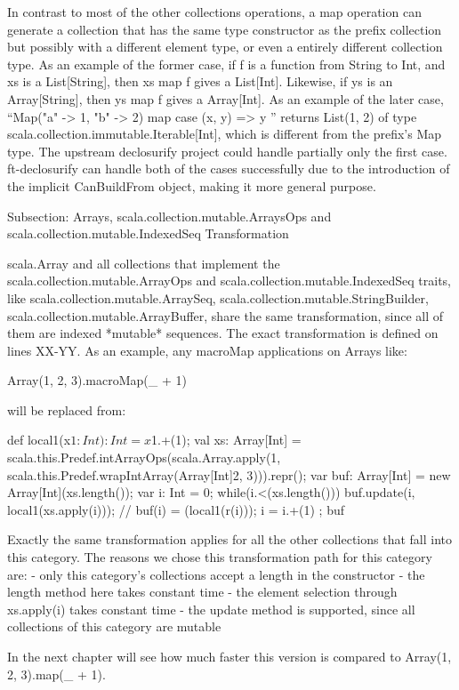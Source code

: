 In contrast to most of the other collections operations, a map operation can
generate a collection that has the same type constructor as the prefix
collection but possibly with a different element type, or even a entirely
different collection type. As an example of the former case, if f is a function
from String to Int, and xs is a List[String], then xs map f gives a List[Int].
Likewise, if ys is an Array[String], then ys map f gives a Array[Int]. As an
example of the later case,   ``Map("a" -> 1, "b" -> 2) map { case (x, y) => y
}'' returns List(1, 2) of type scala.collection.immutable.Iterable[Int],
which is different from the prefix's Map type. The upstream declosurify project
could handle partially only the first case. ft-declosurify can handle both of
the cases successfully due to the introduction of the implicit CanBuildFrom
object, making it more general purpose.


Subsection: Arrays, scala.collection.mutable.ArraysOps and
scala.collection.mutable.IndexedSeq Transformation

scala.Array and all collections that implement the 
scala.collection.mutable.ArrayOps and scala.collection.mutable.IndexedSeq
traits, like scala.collection.mutable.ArraySeq,
scala.collection.mutable.StringBuilder, scala.collection.mutable.ArrayBuffer,
share the same transformation, since all of them are indexed *mutable*
sequences. The exact transformation is defined on lines XX-YY. As an example,
any macroMap applications on Arrays like:

Array(1, 2, 3).macroMap(_ + 1)

will be replaced from:

{
  def local1(x$1: Int): Int = x$1.+(1);
  val xs: Array[Int] = scala.this.Predef.intArrayOps(scala.Array.apply(1,
scala.this.Predef.wrapIntArray(Array[Int]{2, 3}))).repr();
  var buf: Array[Int] = new Array[Int](xs.length());
  var i: Int = 0;
  while(i.<(xs.length())){
    buf.update(i, local1(xs.apply(i))); // buf(i) = (local1(r(i)));
    i = i.+(1)
  };
  buf
}

Exactly the same transformation applies for all the other collections that fall
into this category. The reasons we chose this transformation path for this
category are:
- only this category's collections accept a length in the constructor
- the length method here takes constant time
- the element selection through xs.apply(i) takes constant time
- the update method is supported, since all collections of this category are
mutable

In the next chapter will see how much faster this version is compared to
Array(1, 2, 3).map(_ + 1).

